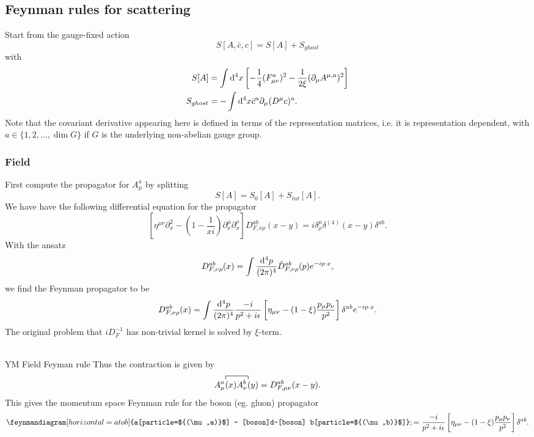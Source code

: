 \subsection{Feynman rules for scattering}
Start from the gauge-fixed action 
\begin{equation}
	S[A,\bar{c},c] = S[A] +S_{ghost}
\end{equation}
with
\begin{align}
S[A] &= \int \mathrm{d}^4 x \left[-\frac{1}{4} (F^a_{\mu \nu})^2 - \frac{1}{2 \xi} (\partial_{\mu}A^{\mu,a})^2\right] \\
S_{ghost}&= - \int \mathrm{d}^4 x \bar{c}^a \partial_\mu (D^\mu c)^a.
\end{align}     
Note that the covariant derivative appearing here is defined in terms of the representation matrices, i.e. it is representation dependent, with $a\in \{1,2,\dots,\dim G\}$ if $G$ is the underlying non-abelian gauge group.
\subsubsection{Field}
First compute the propagator for $A^a_\mu$ by splitting
\begin{equation}
	S[A] = S_0[A] + S_{int} [A].
\end{equation}
We have have the following differential equation for the propagator
\begin{equation}
	\left[\eta^{\mu \nu} \partial^2_x- (1-\frac{1}{xi})  \partial^\mu_x \partial^\nu_x\right]D^{ab}_{F,\nu \rho} (x-y) = i \delta^\mu_\rho \delta^{(4)}(x-y) \delta^{ab}.
\end{equation}
With the ansatz
\begin{equation}
	D^{ab}_{F,\nu \rho}(x) = \int \frac{\mathrm{d}^4p}{(2 \pi)^4} \tilde{D}^{ab}_{F,\nu \rho} (p) e^{-i p \cdot x},
\end{equation}
we find the Feynman propagator to be 
\begin{equation}
	D^{ab}_{F,\nu \rho}(x) = \int\frac{\mathrm{d}^4p}{(2 \pi)^4} \frac{-i}{p^2 +i\epsilon} \left[\eta_{\mu \nu} - (1-\xi) \frac{p_\mu p_\nu}{p^2}\right] \delta^{ab} e^{-ip\cdot x}.
\end{equation}
The original problem that $iD^{-1}_F$ has non-trivial kernel is solved by $\xi$-term.
\\
\\
\begin{mybox}{YM Field Feyman rule}
Thus the contraction is given by
\begin{equation}
\contraction{}{A^a_\mu(x)}{}{A^b_\nu(y)} A^a_\mu(x) A^b_\nu(y) = D^{ab}_{F,\mu \nu} (x-y). 
\end{equation}
This gives the momentum space Feynman rule for the boson (eg. gluon) propagator
\begin{equation}
	\feynmandiagram[horizontal=a to b] {a[particle=${(\mu,a)}$] -- [boson]d--[boson] b[particle=${(\nu,b)}$]};=
\frac{-i}{p^2+i \epsilon} \left[\eta\munu - (1-\xi) \frac{p_\mu p_\nu}{p^2}\right]\delta^{ab}.
\end{equation}
\end{mybox}

